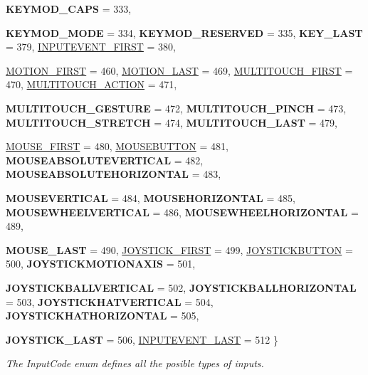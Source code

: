 \begin{DoxyCompactItemize}
{\bfseries KEYMOD\_\-CAPS} =  333, 
\par
{\bfseries KEYMOD\_\-MODE} =  334, 
{\bfseries KEYMOD\_\-RESERVED} =  335, 
{\bfseries KEY\_\-LAST} =  379, 
\hyperlink{classphys_1_1MetaCode_a3e501cbb5bf0f6f1fdb7211465bda8d8a87685f9ca9462b329f2b86a17514f136}{INPUTEVENT\_\-FIRST} =  380, 
\par
\hyperlink{classphys_1_1MetaCode_a3e501cbb5bf0f6f1fdb7211465bda8d8a355649b334e903ada2496ad39dcd5f9d}{MOTION\_\-FIRST} =  460, 
\hyperlink{classphys_1_1MetaCode_a3e501cbb5bf0f6f1fdb7211465bda8d8a59cc92f5b2f42f7a138f8ea22e92d626}{MOTION\_\-LAST} =  469, 
\hyperlink{classphys_1_1MetaCode_a3e501cbb5bf0f6f1fdb7211465bda8d8acdb03d23d93022d5962db5026475b9c7}{MULTITOUCH\_\-FIRST} =  470, 
\hyperlink{classphys_1_1MetaCode_a3e501cbb5bf0f6f1fdb7211465bda8d8a94d804dc2330be620a8009252b5d5d22}{MULTITOUCH\_\-ACTION} =  471, 
\par
{\bfseries MULTITOUCH\_\-GESTURE} =  472, 
{\bfseries MULTITOUCH\_\-PINCH} =  473, 
{\bfseries MULTITOUCH\_\-STRETCH} =  474, 
{\bfseries MULTITOUCH\_\-LAST} =  479, 
\par
\hyperlink{classphys_1_1MetaCode_a3e501cbb5bf0f6f1fdb7211465bda8d8a1bb7f008c7d430e886141a3b8b697129}{MOUSE\_\-FIRST} =  480, 
\hyperlink{classphys_1_1MetaCode_a3e501cbb5bf0f6f1fdb7211465bda8d8a9cc80a2db206fb540fbb92a8ff64268a}{MOUSEBUTTON} =  481, 
{\bfseries MOUSEABSOLUTEVERTICAL} =  482, 
{\bfseries MOUSEABSOLUTEHORIZONTAL} =  483, 
\par
{\bfseries MOUSEVERTICAL} =  484, 
{\bfseries MOUSEHORIZONTAL} =  485, 
{\bfseries MOUSEWHEELVERTICAL} =  486, 
{\bfseries MOUSEWHEELHORIZONTAL} =  489, 
\par
{\bfseries MOUSE\_\-LAST} =  490, 
\hyperlink{classphys_1_1MetaCode_a3e501cbb5bf0f6f1fdb7211465bda8d8a666e564cae666de739b9b3cf047ec578}{JOYSTICK\_\-FIRST} =  499, 
\hyperlink{classphys_1_1MetaCode_a3e501cbb5bf0f6f1fdb7211465bda8d8aaaa2af6a60a9cd7403aa4786ef1ea389}{JOYSTICKBUTTON} =  500, 
{\bfseries JOYSTICKMOTIONAXIS} =  501, 
\par
{\bfseries JOYSTICKBALLVERTICAL} =  502, 
{\bfseries JOYSTICKBALLHORIZONTAL} =  503, 
{\bfseries JOYSTICKHATVERTICAL} =  504, 
{\bfseries JOYSTICKHATHORIZONTAL} =  505, 
\par
{\bfseries JOYSTICK\_\-LAST} =  506, 
\hyperlink{classphys_1_1MetaCode_a3e501cbb5bf0f6f1fdb7211465bda8d8adc78bfd04a85c4bbe39718f9acacbbe3}{INPUTEVENT\_\-LAST} =  512
 \}
\begin{DoxyCompactList}\small\item\em The InputCode enum defines all the posible types of inputs. \item\end{DoxyCompactList}\item 

\end{DoxyCompactItemize}
